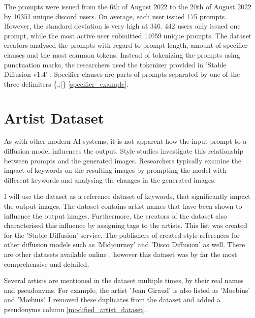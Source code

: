 The prompts were issued from the 6th of August 2022 to the 20th of August 2022 by 10351 unique discord users. On average, each user issued 175 prompts. However, the standard deviation is very high at 346. 442 users only issued one prompt, while the most active user submitted 14059 unique prompts. 
The dataset creators \autocite{poloclub-diffusiondb} analysed the prompts with regard to prompt length, amount of specifier clauses and the most common tokens. Instead of tokenizing the prompts using punctuation marks, the researchers used the tokenizer provided in 'Stable Diffusion v1.4' \autocite{sd}. Specifier clauses are parts of prompts separated by one of the three delimiters \{,;|\} \ref{specifier_example}. 




\section{Artist Dataset}
\label{cha:Artist Dataset}

As with other modern AI systems, it is not apparent how the input prompt to a diffusion model influences the output. Style studies investigate this relationship between prompts and the generated images. Researchers typically examine the impact of keywords on the resulting images by prompting the model with different keywords and analysing the changes in the generated images.

I will use the dataset \autocite{thelist} as a reference dataset of keywords, that significantly impact the output images. The dataset contains artist names that have been shown to influence the output images. Furthermore, the creators of the dataset also characterised this influence by assigning tags to the artists. This list was created for the 'Stable Diffusion' service. The publishers of \autocite{thelist} created style references for other diffusion models such as 'Midjourney' and 'Disco Diffusion' as well.
There are other datasets available online \autocite{sd-fr}, however this dataset was by far the most comprehensive and detailed. 


Several artists are mentioned in the dataset multiple times, by their real names and pseudonyms. For example, the artist 'Jean Giraud' is also listed as 'Moebius' and 'Mœbius'. I removed these duplicates from the dataset and added a pseudonyms column \ref{modified_artist_dataset}.

